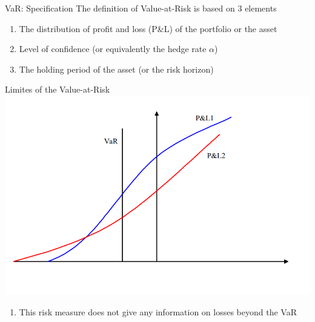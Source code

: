 \documentclass{beamer}
\begin{document}
\begin{frame}{VaR: Specification}
    The definition of Value-at-Risk is based on 3 elements
\begin{enumerate}
    \item The distribution of profit and loss (P\&L) of the portfolio or the asset
    \item Level of confidence (or equivalently the hedge rate $\alpha$)
    \item The holding period of the asset (or the risk horizon) 
\end{enumerate}
\end{frame}

\begin{frame}{Limites of the Value-at-Risk}
   \centering
   \includegraphics[width=\textwidth]{static/course_3_img/VAR_tail_risk.PNG}
   \begin{enumerate}
       \item This risk measure does not give any information on losses beyond the VaR
   \end{enumerate} 
\end{frame}
\end{document}
